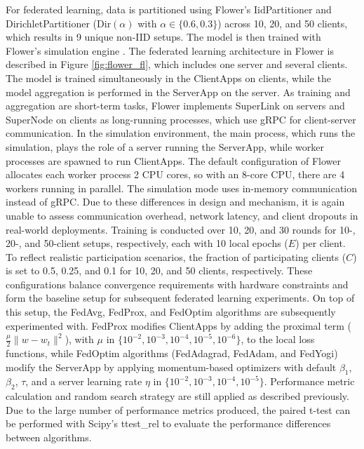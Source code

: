 For federated learning, data is partitioned using Flower's IidPartitioner \citep{iid_partitioner} and DirichletPartitioner ($\text{Dir}(\alpha)$ \citep{dirichlet_partitioner} with $\alpha \in \{0.6, 0.3\}$) across 10, 20, and 50 clients, which results in 9 unique non-IID setups. The model is then trained with Flower's simulation engine \citep{flower-simulation}. The federated learning architecture in Flower is described in Figure \ref{fig:flower_fl}, which includes one server and several clients. The model is trained simultaneously in the ClientApps on clients, while the model aggregation is performed in the ServerApp on the server. As training and aggregation are short-term tasks, Flower implements SuperLink on servers and SuperNode on clients as long-running processes, which use gRPC for client-server communication. In the simulation environment, the main process, which runs the simulation, plays the role of a server running the ServerApp, while worker processes are spawned to run ClientApps. The default configuration of Flower allocates each worker process 2 CPU cores, so with an 8-core CPU, there are 4 workers running in parallel. The simulation mode uses in-memory communication instead of gRPC. Due to these differences in design and mechanism, it is again unable to assess communication overhead, network latency, and client dropouts in real-world deployments. Training is conducted over 10, 20, and 30 rounds for 10-, 20-, and 50-client setups, respectively, each with 10 local epochs ($E$) per client. To reflect realistic participation scenarios, the fraction of participating clients ($C$) is set to 0.5, 0.25, and 0.1 for 10, 20, and 50 clients, respectively. These configurations balance convergence requirements with hardware constraints and form the baseline setup for subsequent federated learning experiments. On top of this setup, the FedAvg, FedProx, and FedOptim algorithms are subsequently experimented with. FedProx modifies ClientApps by adding the proximal term ($\frac{\mu}{2} \lVert w - w_t \rVert^{2}$), with $\mu$ in $\{10^{-2}, 10^{-3}, 10^{-4}, 10^{-5}, 10^{-6}\}$, to the local loss functions, while FedOptim algorithms (FedAdagrad, FedAdam, and FedYogi) modify the ServerApp by applying momentum-based optimizers with default $\beta_1$, $\beta_2$, $\tau$, and a server learning rate $\eta$ in $\{10^{-2}, 10^{-3}, 10^{-4}, 10^{-5}\}$. Performance metric calculation and random search strategy are still applied as described previously. Due to the large number of performance metrics produced, the paired t-test can be performed with Scipy's ttest\_rel \citep{scipyttp} to evaluate the performance differences between algorithms.

